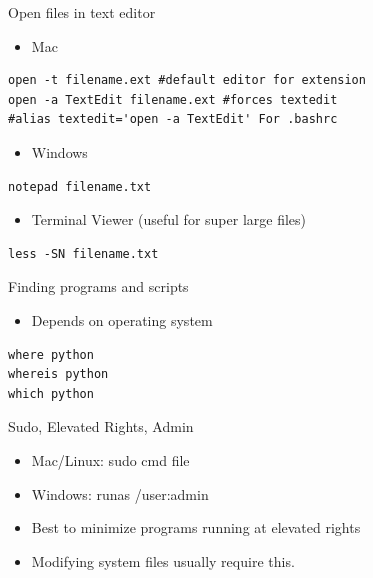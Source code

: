 \documentclass[presentation]{beamer}
\begin{document}
\begin{frame}[fragile,label=sec-3-0-3]{Open files in text editor}
 \begin{itemize}
\item Mac
\end{itemize}
\lstset{numbers=left,language=sh,label= ,caption= }
\begin{lstlisting}
open -t filename.ext #default editor for extension
open -a TextEdit filename.ext #forces textedit
#alias textedit='open -a TextEdit' For .bashrc
\end{lstlisting}
\begin{itemize}
\item Windows
\end{itemize}
\lstset{numbers=left,language=sh,label= ,caption= }
\begin{lstlisting}
notepad filename.txt
\end{lstlisting}
\begin{itemize}
\item Terminal Viewer (useful for super large files)
\end{itemize}
\lstset{numbers=left,language=sh,label= ,caption= }
\begin{lstlisting}
less -SN filename.txt
\end{lstlisting}
\end{frame}


\begin{frame}[fragile,label=sec-3-0-4]{Finding programs and scripts}
 \begin{itemize}
\item Depends on operating system
\end{itemize}

\lstset{numbers=left,language=sh,label= ,caption= }
\begin{lstlisting}
where python
whereis python
which python
\end{lstlisting}
\end{frame}


\begin{frame}[label=sec-3-0-5]{Sudo, Elevated Rights, Admin}
\begin{itemize}
\item Mac/Linux: sudo cmd file
\item Windows: runas /user:admin
\item Best to minimize programs running at elevated rights
\item Modifying system files usually require this.
\end{itemize}
\end{frame}
\end{document}
